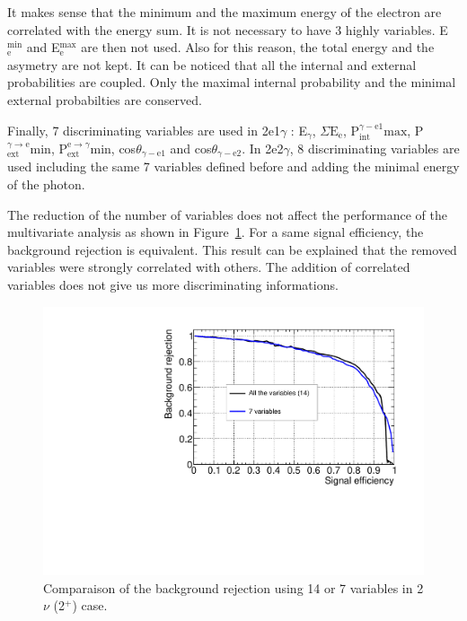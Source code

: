 \documentclass[main.tex]{subfiles}
\begin{document}
\NI It makes sense that the minimum and the maximum energy of the electron are correlated with the energy sum. It is not necessary to have 3 highly variables. E$_\text{e}^{\text{min}}$ and E$_\text{e}^{\text{max}}$ are then not used. Also for this reason, the total energy and the asymetry are not kept. It can be noticed that all the internal and external probabilities are coupled. Only the maximal internal probability and the minimal external probabilties are conserved.


\bigskip


\NI Finally, 7 discriminating variables are used in 2e1$\gamma$ : E$_{\gamma}$, $\Sigma\text{E}_\text{e}$, P$_{\text{int}}^{\gamma-\text{e1}} \text{max}$, P$_{\text{ext}}^{\gamma \rightarrow \text{e}} \text{min}$, P$_{\text{ext}}^{\text{e} \rightarrow \gamma} \text{min}$, cos$\theta_{\gamma-\text{e1}}$ and cos$\theta_{\gamma-\text{e2}}$. In 2e2$\gamma$, 8 discriminating variables are used including the same 7 variables defined before and adding the minimal energy of the photon.


\bigskip


\NI The reduction of the number of variables does not affect the performance of the multivariate analysis as shown in Figure~\ref{CompareTMVA}. For a same signal efficiency, the background rejection is equivalent. This result can be explained that the removed variables were strongly correlated with others. The addition of correlated variables does not give us more discriminating informations.




\begin{figure} [h!]
\begin{center}
\includegraphics[scale=0.50]{pictures/FinalResults/bb2nu2/150/preselection/CompareTMVAReductionVar.pdf}
\end{center}
\caption{Comparaison of the background rejection using 14 or 7 variables in 2$\nu$ (2$^+$) case.}
\label{CompareTMVA}
\end{figure}
\end{document}
